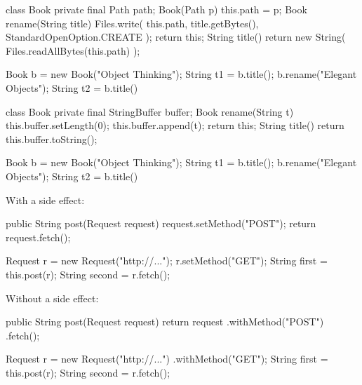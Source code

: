 \documentclass{article}
\begin{document}
\begin{pptWide}{2}
{\scriptsize\begin{ffcode}
class Book {
  private final Path path;
  Book(Path p) { this.path = p; }
  Book rename(String title) {
    Files.write(
      this.path,
      title.getBytes(),
      StandardOpenOption.CREATE
    );
    return this;
  }
  String title() {
    return new String(
      Files.readAllBytes(this.path)
    );
  }
}
\end{ffcode}
}
\par\columnbreak\par
{\small\begin{ffcode}
Book b = new Book("Object Thinking");
String t1 = b.title();
b.rename("Elegant Objects");
String t2 = b.title()
\end{ffcode}
}
\end{pptWide}
\par
\plush{}

\begin{pptWide}{2}
{\small\begin{ffcode}
class Book {
  private final StringBuffer buffer;
  Book rename(String t) {
    this.buffer.setLength(0);
    this.buffer.append(t);
    return this;
  }
  String title() {
    return this.buffer.toString();
  }
}
\end{ffcode}
}
\par\columnbreak\par
{\small\begin{ffcode}
Book b = new Book("Object Thinking");
String t1 = b.title();
b.rename("Elegant Objects");
String t2 = b.title()
\end{ffcode}
}
\end{pptWide}
\par
\plush{}


\begin{pptWide}{2}
With a side effect:\par
{\small\begin{ffcode}
public String post(Request request) {
  request.setMethod("POST");
  return request.fetch();
}

Request r = new Request("http://...");
r.setMethod("GET");
String first = this.post(r);
String second = r.fetch();
\end{ffcode}
}
\par\columnbreak\par
Without a side effect:\par
{\small\begin{ffcode}
public String post(Request request) {
  return request
    .withMethod("POST")
    .fetch();
}

Request r = new Request("http://...")
  .withMethod("GET");
String first = this.post(r);
String second = r.fetch();
\end{ffcode}
}
\end{pptWide}
\par
\plush{}
\end{document}
